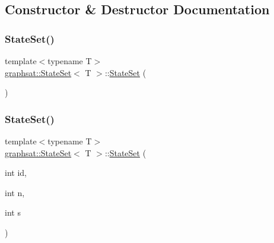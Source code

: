 \subsection{Constructor \& Destructor Documentation}
\mbox{\label{classgraphsat_1_1_state_set_a100b271697892dae7a7c8f60289cbf6e}} 
\subsubsection{\texorpdfstring{StateSet()}{StateSet()}\hspace{0.1cm}{\footnotesize\ttfamily [1/2]}}
{\footnotesize\ttfamily template$<$typename T$>$ \\
\mbox{\hyperlink{classgraphsat_1_1_state_set}{graphsat\+::\+State\+Set}}$<$ T $>$\+::\mbox{\hyperlink{classgraphsat_1_1_state_set}{State\+Set}} (\begin{DoxyParamCaption}{ }\end{DoxyParamCaption})\hspace{0.3cm}{\ttfamily [inline]}}

\mbox{\label{classgraphsat_1_1_state_set_a3c1c4c0746a478a9548f4de5ee14149e}} 
\subsubsection{\texorpdfstring{StateSet()}{StateSet()}\hspace{0.1cm}{\footnotesize\ttfamily [2/2]}}
{\footnotesize\ttfamily template$<$typename T$>$ \\
\mbox{\hyperlink{classgraphsat_1_1_state_set}{graphsat\+::\+State\+Set}}$<$ T $>$\+::\mbox{\hyperlink{classgraphsat_1_1_state_set}{State\+Set}} (\begin{DoxyParamCaption}\item[{int}]{id,  }\item[{int}]{n,  }\item[{int}]{s }\end{DoxyParamCaption})\hspace{0.3cm}{\ttfamily [inline]}}

